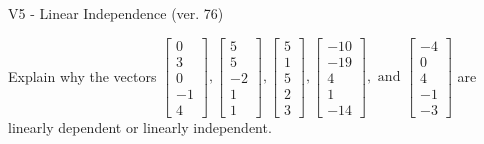 \begin{exercise}
  \begin{exerciseTitle}V5 - Linear Independence (ver. 76)\end{exerciseTitle}
  \begin{exerciseStatement}
    Explain why the vectors \(\left[\begin{array}{r}
0 \\
3 \\
0 \\
-1 \\
4
\end{array}\right] , \left[\begin{array}{r}
5 \\
5 \\
-2 \\
1 \\
1
\end{array}\right] , \left[\begin{array}{r}
5 \\
1 \\
5 \\
2 \\
3
\end{array}\right] , \left[\begin{array}{r}
-10 \\
-19 \\
4 \\
1 \\
-14
\end{array}\right] , \text{ and } \left[\begin{array}{r}
-4 \\
0 \\
4 \\
-1 \\
-3
\end{array}\right]\) are linearly dependent or linearly independent.	



\end{exerciseStatement}
\end{exercise}
